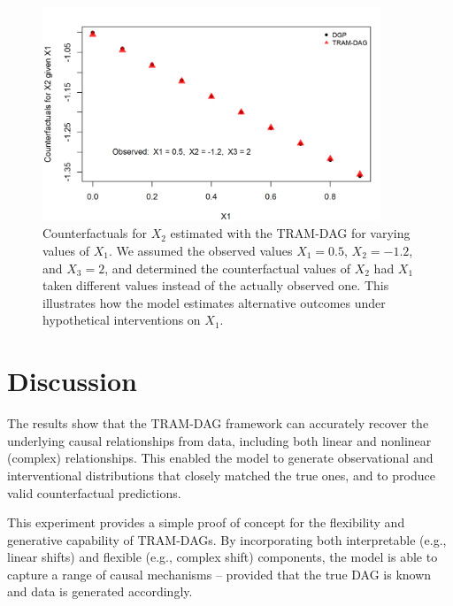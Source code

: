 \begin{figure}[htbp]
\centering
\includegraphics[width=0.9\textwidth]{img/exp1_counterfactuals.png}

\caption{Counterfactuals for $X_2$ estimated with the TRAM-DAG for varying values of $X_1$. We assumed the observed values $X_1 = 0.5$, $X_2 = -1.2$, and $X_3 = 2$, and determined the counterfactual values of $X_2$ had $X_1$ taken different values instead of the actually observed one. This illustrates how the model estimates alternative outcomes under hypothetical interventions on $X_1$.}
\label{fig:exp1_counterfactuals}
\end{figure}



\FloatBarrier

\section{Discussion}

The results show that the TRAM-DAG framework can accurately recover the underlying causal relationships from data, including both linear and nonlinear (complex) relationships. This enabled the model to generate observational and interventional distributions that closely matched the true ones, and to produce valid counterfactual predictions.

This experiment provides a simple proof of concept for the flexibility and generative capability of TRAM-DAGs. By incorporating both interpretable (e.g., linear shifts) and flexible (e.g., complex shift) components, the model is able to capture a range of causal mechanisms -- provided that the true DAG is known and data is generated accordingly.


